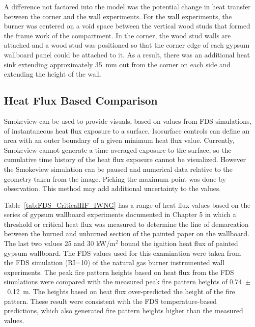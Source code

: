 \documentclass[twoside]{uocthesis}
\begin{document}
{A difference not factored into the model was the potential change in heat transfer between the corner and the wall experiments.  For the wall experiments, the burner was centered on a void space between the vertical wood studs that formed the frame work of the compartment.  In the corner, the wood stud walls are attached and a wood stud was positioned so that the corner edge of each gypsum wallboard panel could be attached to it.  As a result, there was an additional heat sink extending approximately 35~mm out from the corner on each side and extending the height of the wall.

\subsection{Heat Flux Based Comparison}

Smokeview can be used to provide visuals, based on values from FDS simulations, of instantaneous heat flux exposure to a surface.  Isosurface controls can define an area with an outer boundary of a given minimum heat flux value.  Currently, Smokeview cannot generate a time averaged exposure to the surface, so the cumulative time history of the heat flux exposure cannot be visualized.  However the Smokeview simulation can be paused and numerical data relative to the geometry taken from the image. Picking the maximum point was done by observation.  This method may add additional uncertainty to the values.

Table~\ref{tab:FDS_CriticalHF_IWNG} has a range of heat flux values based on the series of gypsum wallboard experiments documented in Chapter 5 in which a threshold or critical heat flux was measured to determine the line of demarcation between the burned and unburned section of the painted paper on the wallboard. The last two values 25 and 30 kW/m$^2$ bound the ignition heat flux of painted gypsum wallboard.  The FDS values used for this examination were taken from the FDS simulation (RI=10) of the natural gas burner instrumented wall experiments.  The peak fire pattern heights based on heat flux from the FDS simulations were compared with the measured peak fire pattern heights of 0.74~$\pm$~0.12~m.  The heights based on heat flux over-predicted the height of the fire pattern.  These result were consistent with the FDS temperature-based predictions, which also generated fire pattern heights higher than the measured values. 

}
\end{document}
